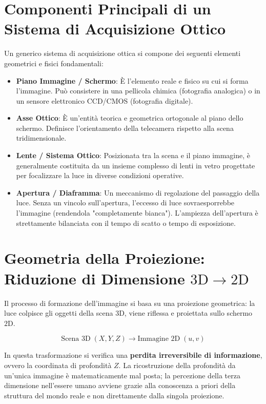 \section{Componenti Principali di un Sistema di Acquisizione Ottico}
Un generico sistema di acquisizione ottica si compone dei seguenti elementi geometrici e fisici fondamentali:
\begin{itemize}
    \item \textbf{Piano Immagine / Schermo}: È l'elemento reale e fisico su cui si forma l'immagine. Può consistere in una pellicola chimica (fotografia analogica) o in un sensore elettronico CCD/CMOS (fotografia digitale).
    \item \textbf{Asse Ottico}: È un'entità teorica e geometrica ortogonale al piano dello schermo. Definisce l'orientamento della telecamera rispetto alla scena tridimensionale.
    \item \textbf{Lente / Sistema Ottico}: Posizionata tra la scena e il piano immagine, è generalmente costituita da un insieme complesso di lenti in vetro progettate per focalizzare la luce in diverse condizioni operative.
    \item \textbf{Apertura / Diaframma}: Un meccanismo di regolazione del passaggio della luce. Senza un vincolo sull'apertura, l'eccesso di luce sovraesporrebbe l'immagine (rendendola "completamente bianca"). L'ampiezza dell'apertura è strettamente bilanciata con il tempo di scatto o tempo di esposizione.
\end{itemize}

\section{Geometria della Proiezione: Riduzione di Dimensione $3\text{D} \to 2\text{D}$}
Il processo di formazione dell'immagine si basa su una proiezione geometrica: la luce colpisce gli oggetti della scena $3\text{D}$, viene riflessa e proiettata sullo schermo $2\text{D}$.

\begin{equation}
    \text{Scena } 3\text{D} \; (X, Y, Z) \longrightarrow \text{Immagine } 2\text{D} \; (u, v)
\end{equation}

In questa trasformazione si verifica una \textbf{perdita irreversibile di informazione}, ovvero la coordinata di profondità $Z$. La ricostruzione della profondità da un'unica immagine è matematicamente mal posta; la percezione della terza dimensione nell'essere umano avviene grazie alla conoscenza a priori della struttura del mondo reale e non direttamente dalla singola proiezione.

